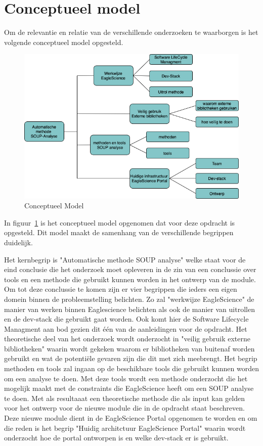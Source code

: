 \section{Conceptueel model}\label{sec:conceptueel-model}
Om de relevantie en relatie van de verschillende onderzoeken te waarborgen is het volgende conceptueel model opgesteld.
\begin{figure}[H]
    \centering
    \includegraphics[width=12cm]{gfx/Conceptueel Model}
    \caption{Conceptueel Model}
    \label{fig:ConceptueelModel}
\end{figure}

In figuur~\ref{fig:ConceptueelModel} is het conceptueel model opgenomen dat voor deze opdracht is opgesteld. Dit model maakt de samenhang van de verschillende begrippen duidelijk.

Het kernbegrip is "Automatische methode SOUP analyse" welke staat voor de eind conclusie die het onderzoek moet opleveren in de zin van een conclussie over tools en een methode die gebruikt kunnen worden in het ontwerp van de module. Om tot deze conclussie te komen zijn er vier begrippen die ieders een eigen domein binnen de probleemstelling belichten. Zo zal "werkwijze EagleScience" de manier van werken binnen Eaglescience belichten als ook de manier van uitrollen en de dev-stack die gebruikt gaat worden. Ook komt hier de Software Lifecycle Managment aan bod gezien dit één van de aanleidingen voor de opdracht. Het theoretische deel van het onderzoek wordt onderzocht in "veilig gebruik externe bibliotheken" waarin wordt gekeken waarom er bibliotheken van buitenaf worden gebruikt en wat de potentiële gevaren zijn die dit met zich meebrengt. Het begrip methoden en tools zal ingaan op de beschikbare tools die gebruikt kunnen worden om een analyse te doen. Met deze tools wordt een methode onderzocht die het mogelijk maakt met de constraints die EagleScience heeft om een SOUP analyse te doen. Met als resultaaat een theoretische methode die als input kan gelden voor het ontwerp voor de nieuwe module die in de opdracht staat beschreven. Deze nieuwe module dient in de EagleScience Portal opgenomen te worden en om die reden is het begrip "Huidig architctuur EagleScience Portal" waarin wordt onderzocht hoe de portal ontworpen is en welke dev-stack er is gebruikt.


